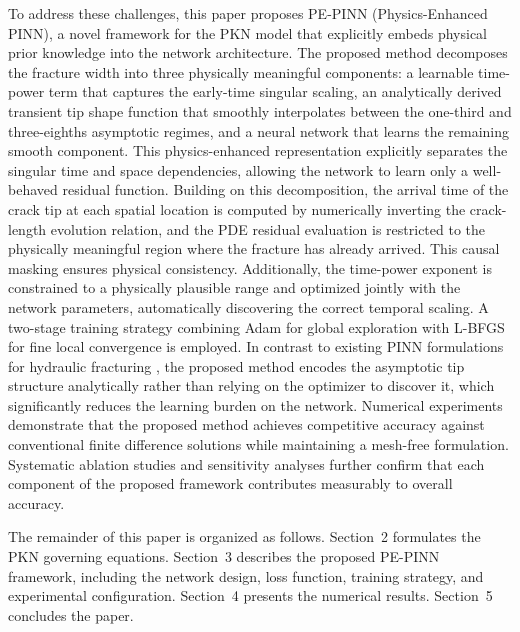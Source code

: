 \documentclass{ws-ijcm}
\begin{document}
To address these challenges, this paper proposes PE-PINN
(Physics-Enhanced PINN), a novel framework for the PKN model that
explicitly embeds physical prior knowledge into the network architecture.
The proposed method decomposes the fracture width into three physically
meaningful components: a learnable time-power term that captures the
early-time singular scaling, an analytically derived transient tip shape
function that smoothly interpolates between the one-third and
three-eighths asymptotic regimes, and a neural network that learns the
remaining smooth component. This physics-enhanced representation
explicitly separates the singular time and space dependencies, allowing
the network to learn only a well-behaved residual function. Building on
this decomposition, the arrival time of the crack tip at each spatial
location is computed by numerically inverting the crack-length evolution
relation, and the PDE residual evaluation is restricted to the physically
meaningful region where the fracture has already arrived. This causal
masking ensures
physical consistency. Additionally, the time-power exponent is
constrained to a physically plausible range and optimized jointly with
the network parameters, automatically discovering the correct temporal
scaling. A two-stage training strategy combining Adam \cite{Kingma2015}
for global exploration with L-BFGS \cite{Liu1989} for fine local
convergence is employed. In contrast to existing PINN formulations for
hydraulic fracturing \cite{Yang2023,Tang2024}, the proposed method
encodes the asymptotic tip structure analytically rather than relying on
the optimizer to discover it, which significantly reduces the learning
burden on the network. Numerical experiments demonstrate that the
proposed method achieves competitive accuracy against conventional
finite difference solutions while maintaining a mesh-free formulation.
Systematic ablation studies and sensitivity analyses further confirm
that each component of the proposed framework contributes measurably to
overall accuracy.

The remainder of this paper is organized as follows. Section~2 formulates
the PKN governing equations. Section~3 describes the proposed PE-PINN
framework, including the network design, loss function, training
strategy, and experimental configuration. Section~4 presents the
numerical results. Section~5 concludes the paper.

\end{document}

